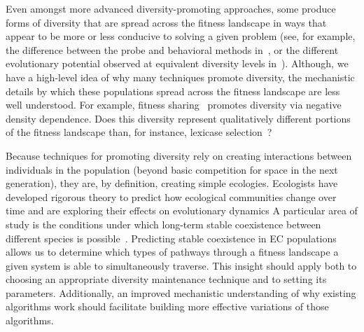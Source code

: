 Even amongst more advanced diversity-promoting %
approaches, some %
produce forms of diversity that are spread across the fitness landscape in ways that appear to be more or less conducive to solving a given problem %
(see, for example, the difference between the probe and behavioral methods in~\cite{mouret_using_2009}, or the different evolutionary potential observed at equivalent diversity levels in~\cite{walker_evolutionary_2012}). Although, we have a high-level idea of why many techniques promote diversity, %
the mechanistic details by which these populations spread across the fitness landscape are less well understood.
For example, %
fitness sharing~\cite{goldberg_genetic_1987} promotes diversity via negative density dependence. Does this diversity represent qualitatively different portions of the fitness landscape than, for instance, lexicase selection~\cite{spector_assessment_2012}?

Because techniques for promoting diversity rely on creating interactions between individuals in the population (beyond basic competition for space in the next generation),
they are, by definition, creating simple ecologies. Ecologists have developed rigorous theory to predict how ecological communities change over time and are %
exploring their effects on evolutionary dynamics
A particular area of study is the conditions under which long-term stable coexistence between different species is possible~\cite{pacala_limiting_1994, chesson_mechanisms_2000,chase_ecological_2003,letten_linking_2017}. Predicting stable coexistence in EC populations allows us to determine which types of pathways through a fitness landscape a given system is able to simultaneously traverse.%
This insight should apply both to choosing an appropriate diversity maintenance technique and to setting its parameters.%
Additionally, an improved mechanistic understanding of why existing algorithms work should facilitate building more effective variations of those algorithms.

